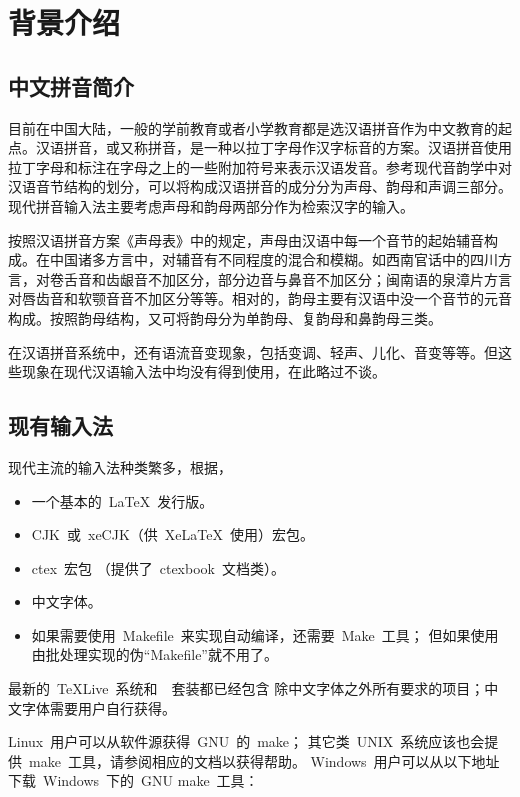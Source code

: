 \chapter{背景介绍}
	\section{中文拼音简介}

	目前在中国大陆，一般的学前教育或者小学教育都是选汉语拼音作为中文教育的起点。汉语拼音，或又称拼音，是一种以拉丁字母作汉字标音的方案。\supercite{wjm}汉语拼音使用拉丁字母和标注在字母之上的一些附加符号来表示汉语发音。参考现代音韵学中对汉语音节结构的划分，可以将构成汉语拼音的成分分为声母、韵母和声调三部分。现代拼音输入法主要考虑声母和韵母两部分作为检索汉字的输入。

	按照汉语拼音方案《声母表》中的规定，声母由汉语中每一个音节的起始辅音构成。在中国诸多方言中，对辅音有不同程度的混合和模糊。如西南官话中的四川方言，对卷舌音和齿龈音不加区分，部分边音与鼻音不加区分；闽南语的泉漳片方言对唇齿音和软颚音音不加区分等等。\supercite{jdp}相对的，韵母主要有汉语中没一个音节的元音构成。按照韵母结构，又可将韵母分为单韵母、复韵母和鼻韵母三类。

	在汉语拼音系统中，还有语流音变现象，包括变调、轻声、儿化、音变等等。但这些现象在现代汉语输入法中均没有得到使用，在此略过不谈。

	\section{现有输入法\label{sec:writing}}

	现代主流的输入法种类繁多，根据，
	\begin{itemize}\denselist
		\item 一个基本的~\LaTeX{}~发行版。
		\item CJK~或~xeCJK（供~Xe\LaTeX{}~使用）宏包。
		\item ctex~宏包\supercite{ctex-doc,ctexfaq}%
			（提供了~ctexbook~文档类）。
		\item 中文字体。
		\item 如果需要使用~Makefile~来实现自动编译，还需要~Make~工具；
			但如果使用由批处理实现的伪“Makefile”就不用了。
	\end{itemize}

	最新的~\TeX{}Live~系统和~\CTeX~套装都已经包含%
	除中文字体之外所有要求的项目；中文字体需要用户自行获得。

	Linux~用户可以从软件源获得~GNU~的~make；
	其它类~UNIX~系统应该也会提供~make~工具，请参阅相应的文档以获得帮助。
	Windows~用户可以从以下地址下载~Windows~下的~GNU make~工具：

